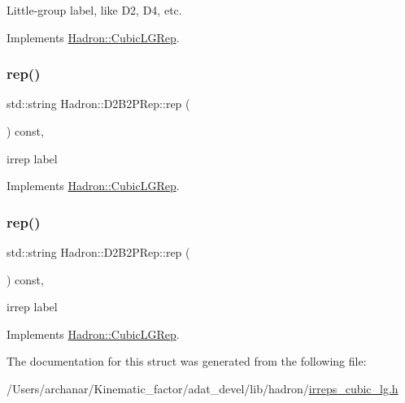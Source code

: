 Little-\/group label, like D2, D4, etc. 

Implements \mbox{\hyperlink{structHadron_1_1CubicLGRep_a9bdb14b519a611d21379ed96a3a9eb41}{Hadron\+::\+Cubic\+L\+G\+Rep}}.

\mbox{\label{structHadron_1_1D2B2PRep_a5def410cb7d63545ef2a907e86c16bf3}} 
\subsubsection{\texorpdfstring{rep()}{rep()}\hspace{0.1cm}{\footnotesize\ttfamily [1/2]}}
{\footnotesize\ttfamily std\+::string Hadron\+::\+D2\+B2\+P\+Rep\+::rep (\begin{DoxyParamCaption}{ }\end{DoxyParamCaption}) const\hspace{0.3cm}{\ttfamily [inline]}, {\ttfamily [virtual]}}

irrep label 

Implements \mbox{\hyperlink{structHadron_1_1CubicLGRep_a50f5ddbb8f4be4cee0106fa9e8c75e6c}{Hadron\+::\+Cubic\+L\+G\+Rep}}.

\mbox{\label{structHadron_1_1D2B2PRep_a5def410cb7d63545ef2a907e86c16bf3}} 
\subsubsection{\texorpdfstring{rep()}{rep()}\hspace{0.1cm}{\footnotesize\ttfamily [2/2]}}
{\footnotesize\ttfamily std\+::string Hadron\+::\+D2\+B2\+P\+Rep\+::rep (\begin{DoxyParamCaption}{ }\end{DoxyParamCaption}) const\hspace{0.3cm}{\ttfamily [inline]}, {\ttfamily [virtual]}}

irrep label 

Implements \mbox{\hyperlink{structHadron_1_1CubicLGRep_a50f5ddbb8f4be4cee0106fa9e8c75e6c}{Hadron\+::\+Cubic\+L\+G\+Rep}}.



The documentation for this struct was generated from the following file\+:\begin{DoxyCompactItemize}
\item 
/\+Users/archanar/\+Kinematic\+\_\+factor/adat\+\_\+devel/lib/hadron/\mbox{\hyperlink{lib_2hadron_2irreps__cubic__lg_8h}{irreps\+\_\+cubic\+\_\+lg.\+h}}\end{DoxyCompactItemize}
